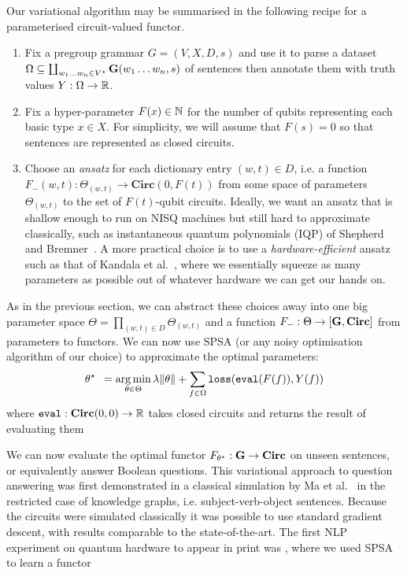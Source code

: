 Our variational algorithm may be summarised in the following recipe for a parameterised circuit-valued functor.
\begin{enumerate}
\item Fix a pregroup grammar $G = (V, X, D, s)$ and use it to parse a dataset $\Omega \subseteq \coprod_{w_1 \dots w_n \in V^\star} \mathbf{G}(w_1 \dots w_n, s)$ of sentences then annotate them with truth values $Y : \Omega \to \mathbb{R}$.
\item Fix a hyper-parameter $F(x) \in \mathbb{N}$ for the number of qubits representing each basic type $x \in X$.
For simplicity, we will assume that $F(s) = 0$ so that sentences are represented as closed circuits.
\item Choose an \emph{ansatz} for each dictionary entry $(w, t) \in D$, i.e. a function $F_-(w, t) : \Theta_{(w, t)} \to \mathbf{Circ}(0, F(t))$ from some space of parameters $\Theta_{(w, t)}$ to the set of $F(t)$-qubit circuits.
Ideally, we want an ansatz that is shallow enough to run on NISQ machines but still hard to approximate classically, such as instantaneous quantum polynomials (IQP) of Shepherd and Bremner~\cite{ShepherdBremner09}.
A more practical choice is to use a \emph{hardware-efficient} ansatz such as that of Kandala et al.~\cite{KandalaEtAl17}, where we essentially squeeze as many parameters as possible out of whatever hardware we can get our hands on.
\end{enumerate}
As in the previous section, we can abstract these choices away into one big parameter space $\Theta = \prod_{(w, t) \in D} \Theta_{(w, t)}$ and a function $F_- : \Theta \to [\mathbf{G}, \mathbf{Circ}]$ from parameters to functors.
We can now use SPSA (or any noisy optimisation algorithm of our choice) to approximate the optimal parameters:
$$\theta^\star \enspace = \operatorname*{arg\,min}_{\theta \in \Theta}
\lambda \lVert \theta \rVert + \sum_{f \in \Omega} \mathtt{loss}(\mathtt{eval}(F(f)), Y(f))$$
where $\mathtt{eval} : \mathbf{Circ}(0, 0) \to \mathbb{R}$ takes closed circuits and returns the result of evaluating them

We can now evaluate the optimal functor $F_{\theta^\star} : \mathbf{G} \to \mathbf{Circ}$ on unseen sentences, or equivalently answer Boolean questions.
This variational approach to question answering was first demonstrated in a classical simulation by Ma et al.~\cite{MaEtAl19} in the restricted case of knowledge graphs, i.e. subject-verb-object sentences.
Because the circuits were simulated classically it was possible to use standard gradient descent, with results comparable to the state-of-the-art.
The first NLP experiment on quantum hardware to appear in print was \cite{MeichanetzidisEtAl20}, where we used SPSA to learn a functor
